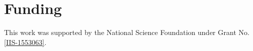 \documentclass[11pt]{article}
\begin{document}
\section*{Funding} %
This work was supported by the National Science Foundation under Grant No.\ 
\href{http://nsf.gov/awardsearch/showAward?AWD_ID=1553063}{ [IIS-1553063]}.





   
%
   
%


\end{document}
